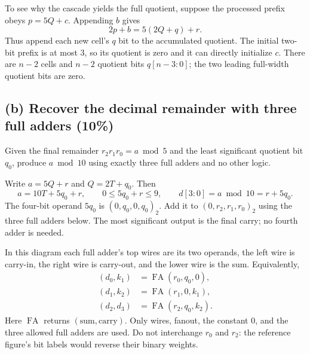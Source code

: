 \begin{solution}
To see why the cascade yields the full quotient, suppose the processed prefix obeys $p=5Q+c$. Appending $b$ gives
\[
2p+b=5(2Q+q)+r.
\]
Thus append each new cell's $q$ bit to the accumulated quotient. The initial two-bit prefix is at most 3, so its quotient is zero and it can directly initialize $c$. There are $n-2$ cells and $n-2$ quotient bits $q[n-3:0]$; the two leading full-width quotient bits are zero.
\end{solution}

\subsection{(b) Recover the decimal remainder with three full adders (10\%)}
\begin{question}
Given the final remainder $r_2r_1r_0=a\bmod5$ and the least significant quotient bit $q_0$, produce $a\bmod10$ using exactly three full adders and no other logic.
\end{question}
\begin{solution}
Write $a=5Q+r$ and $Q=2T+q_0$. Then
\[
a=10T+5q_0+r,\qquad 0\le 5q_0+r\le9,
\qquad\boxed{d[3:0]=a\bmod10=r+5q_0.}
\]
The four-bit operand $5q_0$ is $(0,q_0,0,q_0)_2$. Add it to $(0,r_2,r_1,r_0)_2$ using the three full adders below. The most significant output is the final carry; no fourth adder is needed.
\begin{center}
\end{center}
In this diagram each full adder's top wires are its two operands, the left wire is carry-in, the right wire is carry-out, and the lower wire is the sum. Equivalently,
\begin{align*}
(d_0,k_1)&=\operatorname{FA}(r_0,q_0,0),\\
(d_1,k_2)&=\operatorname{FA}(r_1,0,k_1),\\
(d_2,d_3)&=\operatorname{FA}(r_2,q_0,k_2).
\end{align*}
Here $\operatorname{FA}$ returns $(\text{sum},\text{carry})$. Only wires, fanout, the constant 0, and the three allowed full adders are used. Do not interchange $r_0$ and $r_2$: the reference figure's bit labels would reverse their binary weights.
\end{solution}

